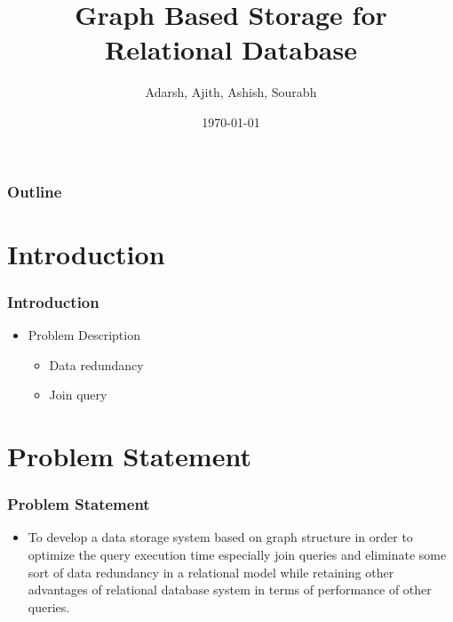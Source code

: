 \documentclass[14pt,xcolor=dvipsnames, aspectratio=169]{beamer}
\title{Graph Based Storage for Relational Database}
\author{Adarsh, Ajith, Ashish, Sourabh}
\date{\today}
\begin{document}
\begin{frame}
\titlepage
\end{frame}


\begin{frame}
\frametitle{Outline}
\begin{multicols}{2}
\tableofcontents[hideallsubsections]
\end{multicols}
\end{frame}

\section{Introduction}
\begin{frame}
\frametitle{Introduction}
\begin{itemize} 
 \item Problem Description
  \begin{itemize}
    \item Data redundancy
    \item Join query
  \end{itemize}
\end{itemize}
\end{frame}

\section{Problem Statement}
\begin{frame}
\frametitle{Problem Statement}
\begin{itemize}
  \item To develop a data storage system based on graph structure in order to optimize the query execution time especially join queries and eliminate some sort of data redundancy in a relational model while retaining other advantages of relational database system in terms of performance of other queries.
\end{itemize}
\end{frame}
\end{document}
